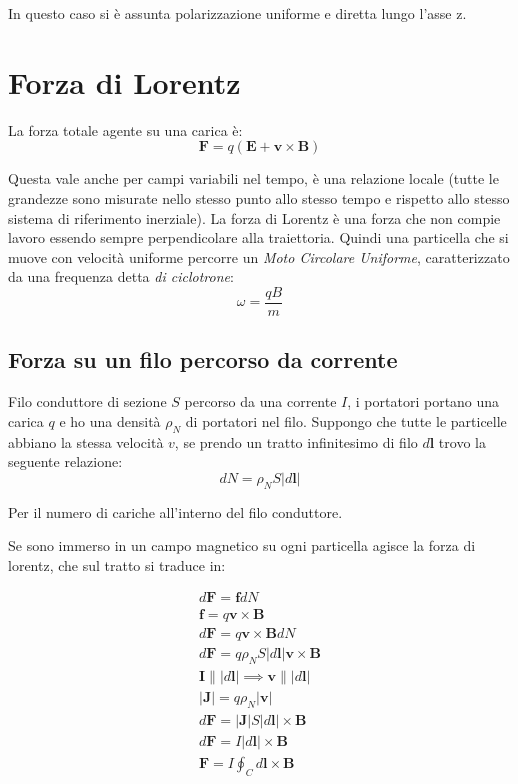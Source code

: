 \documentclass[a4paper]{scrarticle}
\begin{document}
In questo caso si è assunta polarizzazione uniforme e diretta lungo l'asse z.


\section{Forza di Lorentz}

La forza totale agente su una carica è:
\begin{equation}
    \bm F = q \left(\bm E + \bm v \times \bm B\right)
\end{equation}

Questa vale anche per campi variabili nel tempo, è una relazione locale (tutte le grandezze sono misurate nello stesso punto allo stesso tempo e rispetto allo stesso sistema di riferimento inerziale).
La forza di Lorentz è una forza che non compie lavoro essendo sempre perpendicolare alla traiettoria.
Quindi una particella che si muove con velocità uniforme percorre un \emph{Moto Circolare Uniforme}, caratterizzato da una frequenza detta \emph{di ciclotrone}:
\begin{equation}
    \omega = \frac{qB}{m}
\end{equation}

\subsection*{Forza su un filo percorso da corrente}

Filo conduttore di sezione $S$ percorso da una corrente $I$, i portatori portano una carica $q$ e ho una densità $\rho_N$ di portatori nel filo.
Suppongo che tutte le particelle abbiano la stessa velocità $v$, se prendo un tratto infinitesimo di filo $d\bm l $ trovo la seguente relazione:
\begin{equation*}
    dN = \rho_N S |d\bm l|
\end{equation*}

Per il numero di cariche all'interno del filo conduttore.

Se sono immerso in un campo magnetico su ogni particella agisce la forza di lorentz, che sul tratto si traduce in:

\begin{gather*}
    d \bm F = \bm f  dN\\
    \bm f = q \bm v \times \bm B\\
    d \bm F = q \bm v \times \bm B  dN\\
    d \bm F = q \rho_N S |d\bm l| \bm v \times \bm B\\
    \bm I \parallel |d \bm l| \implies \bm v \parallel |d \bm l|\\
    |\bm J| = q \rho_N |\bm v|\\ 
    d \bm F = |\bm J| S |d\bm l| \times \bm B\\
    d \bm F = I |d\bm l| \times \bm B\\
    \bm F = I \oint_C d\bm l \times \bm B
\end{gather*}
\end{document}
